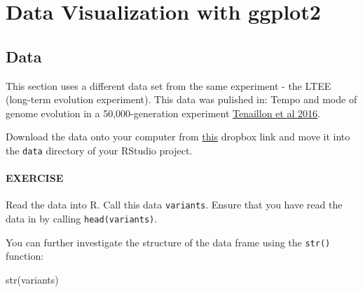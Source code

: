 \documentclass[
]{book}
\newenvironment{Shaded}{\begin{snugshade}}{\end{snugshade}}
\newcommand{\FunctionTok}[1]{\textcolor[rgb]{0.00,0.00,0.00}{#1}}
\newcommand{\NormalTok}[1]{#1}
\begin{document}
\hypertarget{data-visualization-with-ggplot2}{%
\chapter{Data Visualization with ggplot2}\label{data-visualization-with-ggplot2}}

\hypertarget{data}{%
\section{Data}\label{data}}

This section uses a different data set from the same experiment - the LTEE (long-term evolution experiment). This data was pulished in: Tempo and mode of genome evolution in a 50,000-generation experiment \href{https://www.ncbi.nlm.nih.gov/pmc/articles/PMC4988878/}{Tenaillon et al 2016}.

Download the data onto your computer from \href{https://www.dropbox.com/sh/pegir6j09mq7sia/AACQO9BnNAEl4EofAhmyqjmXa?dl=0}{this} dropbox link and move it into the \texttt{data} directory of your RStudio project.

\hypertarget{exercise}{%
\subsubsection*{EXERCISE}\label{exercise}}

Read the data into R. Call this data \texttt{variants}. Ensure that you have read the data in by calling \texttt{head(variants)}.

You can further investigate the structure of the data frame using the \texttt{str()} function:

\begin{Shaded}
\begin{Highlighting}[]
\FunctionTok{str}\NormalTok{(variants)}
\end{Highlighting}
\end{Shaded}
\end{document}
